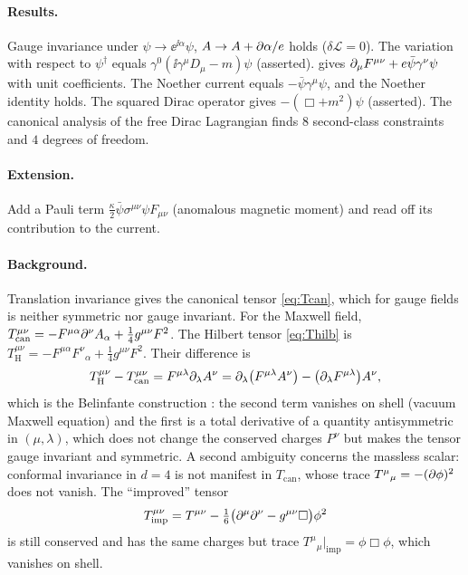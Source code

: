 \paragraph{Results.} Gauge invariance under $\psi\to\ee^{\ii\alpha}\psi$, $A\to A+\partial\alpha/e$ holds ($\delta\mathcal L=0$). The variation with respect to $\psi^\dagger$ equals $\gamma^0(\ii\gamma^\mu D_\mu-m)\psi$ (asserted).  gives $\partial_\mu F^{\mu\nu}+e\bar\psi\gamma^\nu\psi$ with unit coefficients. The Noether current equals $-\bar\psi\gamma^\mu\psi$, and the Noether identity holds. The squared Dirac operator gives $-(\Box+m^2)\psi$ (asserted). The canonical analysis of the free Dirac Lagrangian finds $8$ second-class constraints and $4$ degrees of freedom.

\paragraph{Extension.} Add a Pauli term $\tfrac{\kappa}{2}\bar\psi\sigma^{\mu\nu}\psi F_{\mu\nu}$ (anomalous magnetic moment) and read off its contribution to the current.


\paragraph{Background.} Translation invariance gives the canonical tensor \cref{eq:Tcan}, which for gauge fields is neither symmetric nor gauge invariant. For the Maxwell field, $T^{\mu\nu}_{\mathrm{can}}=-F^{\mu\alpha}\partial^\nu A_\alpha+\tfrac14g^{\mu\nu}F^2$. The Hilbert tensor \cref{eq:Thilb} is $T^{\mu\nu}_{\mathrm H}=-F^{\mu\alpha}F^\nu{}_\alpha+\tfrac14g^{\mu\nu}F^2$. Their difference is
\begin{equation}
T_{\mathrm H}^{\mu\nu}-T_{\mathrm{can}}^{\mu\nu}=F^{\mu\lambda}\partial_\lambda A^\nu=\partial_\lambda\big(F^{\mu\lambda}A^\nu\big)-\big(\partial_\lambda F^{\mu\lambda}\big)A^\nu,
\label{eq:belinfante}
\end{equation}
which is the Belinfante construction \cite{Belinfante1940,Rosenfeld1940}: the second term vanishes on shell (vacuum Maxwell equation) and the first is a total derivative of a quantity antisymmetric in $(\mu,\lambda)$, which does not change the conserved charges $P^\nu$ but makes the tensor gauge invariant and symmetric. A second ambiguity concerns the massless scalar: conformal invariance in $d=4$ is not manifest in $T_{\mathrm{can}}$, whose trace $T^\mu{}_\mu=-(\partial\phi)^2$ does not vanish. The ``improved'' tensor \cite{CallanColemanJackiw1970}
\begin{equation}
T^{\mu\nu}_{\mathrm{imp}}=T^{\mu\nu}-\tfrac16\big(\partial^\mu\partial^\nu-g^{\mu\nu}\square\big)\phi^2
\end{equation}
is still conserved and has the same charges but trace $T^\mu{}_\mu\big|_{\mathrm{imp}}=\phi\Box\phi$, which vanishes on shell.

